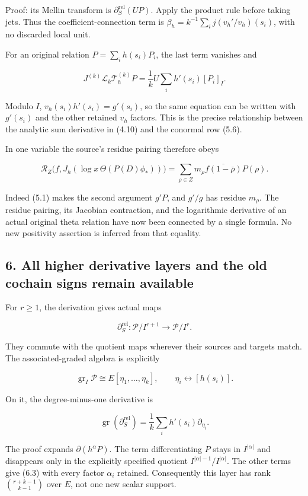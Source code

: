 \documentclass[
]{article}
\begin{document}
Proof: its Mellin transform is \(\partial_S^{\mathrm{rel}}(UP)\). Apply
the product rule before taking jets. Thus the coefficient-connection
term is \(\beta_h=k^{-1}\sum_i j(v_h'/v_h)(s_i)\), with no discarded
local unit.

For an original relation \(P=\sum_i h(s_i)P_i\), the last term vanishes
and

\[\boxed{J^{(k)}\mathscr L_k\mathcal T_h^{(k)}P
=\frac1kU\sum_i h'(s_i)[P_i]_I.}\tag{5.12}\]

Modulo \(I\), \(v_h(s_i)h'(s_i)=g'(s_i)\), so the same equation can be
written with \(g'(s_i)\) and the other retained \(v_h\) factors. This is
the precise relationship between the analytic sum derivative in (4.10)
and the conormal row (5.6).

In one variable the source's residue pairing therefore obeys

\[\boxed{\mathscr R_Z\bigl(f,J_h(\log x\,\Theta(P(D)\phi_*))\bigr)
=\sum_{\rho\in Z}m_\rho\overline{f(1-\bar\rho)}P(\rho).}\tag{5.13}\]

Indeed (5.1) makes the second argument \(g'P\), and \(g'/g\) has residue
\(m_\rho\). The residue pairing, its Jacobian contraction, and the
logarithmic derivative of an actual original theta relation have now
been connected by a single formula. No new positivity assertion is
inferred from that equality.

\subsection{6. All higher derivative layers and the old cochain signs
remain
available}\label{all-higher-derivative-layers-and-the-old-cochain-signs-remain-available}

For \(r\ge1\), the derivation gives actual maps

\[\partial_S^{\mathrm{rel}}:\mathcal P/I^{r+1}\longrightarrow\mathcal P/I^r.\tag{6.1}\]

They commute with the quotient maps wherever their sources and targets
match. The associated-graded algebra is explicitly

\[\operatorname{gr}_I\mathcal P\cong E[\eta_1,\ldots,\eta_k],\qquad
\eta_i\longleftrightarrow[h(s_i)].\tag{6.2}\]

On it, the degree-minus-one derivative is

\[\boxed{\operatorname{gr}(\partial_S^{\mathrm{rel}})
=\frac1k\sum_i h'(s_i)\partial_{\eta_i}.}\tag{6.3}\]

The proof expands \(\partial(h^\alpha P)\). The term differentiating
\(P\) stays in \(I^{|\alpha|}\) and disappears only in the explicitly
specified quotient \(I^{|\alpha|-1}/I^{|\alpha|}\). The other terms give
(6.3) with every factor \(\alpha_i\) retained. Consequently this layer
has rank \(\binom{r+k-1}{k-1}\) over \(E\), not one new scalar support.
\end{document}

